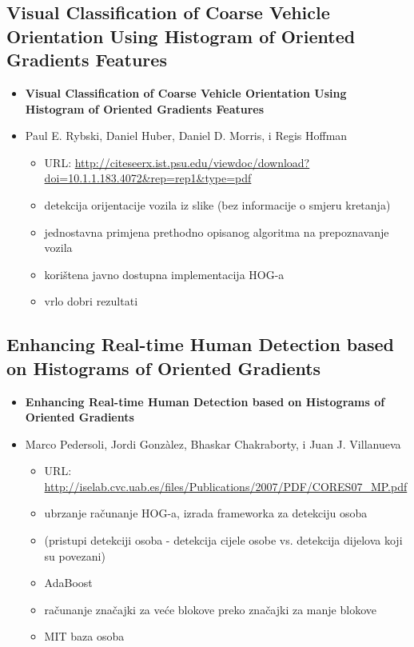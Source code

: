 \documentclass[times, utf8, seminar, numeric]{fer}
\begin{document}
\subsection{Visual Classification of Coarse Vehicle Orientation Using Histogram of Oriented Gradients Features}
\begin{itemize}
\item \textbf{Visual Classification of Coarse Vehicle Orientation Using Histogram of Oriented Gradients Features} 
\item Paul E. Rybski, Daniel Huber, Daniel D. Morris, i Regis Hoffman
\begin{itemize}
		\item URL: \url{http://citeseerx.ist.psu.edu/viewdoc/download?doi=10.1.1.183.4072&rep=rep1&type=pdf}
		\item detekcija orijentacije vozila iz slike (bez informacije o smjeru kretanja)
		\item jednostavna primjena prethodno opisanog algoritma na prepoznavanje vozila
		\item korištena javno dostupna implementacija HOG-a
		\item vrlo dobri rezultati
	\end{itemize}
\end{itemize}

\subsection{Enhancing Real-time Human Detection based on Histograms of Oriented Gradients}
\begin{itemize}
		\item \textbf{Enhancing Real-time Human Detection based on Histograms of Oriented Gradients} 
	\item Marco Pedersoli, Jordi Gonzàlez, Bhaskar Chakraborty, i Juan J. Villanueva
	\begin{itemize} 
		\item URL: \url{http://iselab.cvc.uab.es/files/Publications/2007/PDF/CORES07_MP.pdf}
		\item ubrzanje računanje HOG-a, izrada frameworka za detekciju osoba
		\item (pristupi detekciji osoba - detekcija cijele osobe vs. detekcija dijelova koji su povezani)
		\item AdaBoost
		\item računanje značajki za veće blokove preko značajki za manje blokove
		\item MIT baza osoba
		\end{itemize}
\end{itemize}
\end{document}
